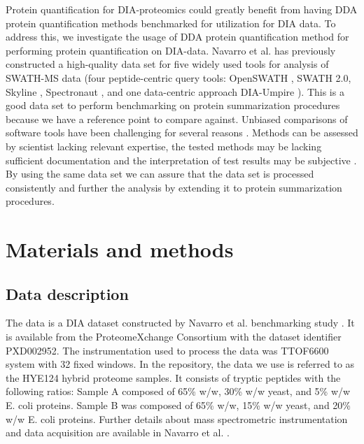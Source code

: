 \documentclass[10pt,letterpaper]{article}
\begin{document}
{Protein quantification for DIA-proteomics could greatly benefit from having DDA protein quantification methods benchmarked for utilization for DIA data. To address this, we investigate the usage of DDA protein quantification method for performing protein quantification on DIA-data. Navarro et al. \cite{navarro2016multicenter} has previously constructed a high-quality data set for five widely used tools for analysis of SWATH-MS data (four peptide-centric query tools: OpenSWATH \cite{rost2014openswath}, SWATH 2.0, Skyline \cite{maclean2010skyline}, Spectronaut \cite{bruderer2015extending}, and one data-centric approach DIA-Umpire \cite{maclean2010skyline}). This is a good data set to perform benchmarking on protein summarization procedures because we have a reference point to compare against. Unbiased comparisons of software tools have been challenging for several reasons \cite{dufresne2014abrf}. Methods can be assessed by scientist lacking relevant expertise, the tested methods may be lacking sufficient documentation and the interpretation of test results may be subjective \cite{yates2012toward} \cite{leprevost2014best} \cite{pak2013clustering} \cite{faircomparison2015}. By using the same data set we can assure that the data set is processed consistently and further the analysis by extending it to protein summarization procedures.


\section*{Materials and methods}
\subsection*{Data description}

The data is a DIA dataset constructed by Navarro et al. benchmarking study \cite{navarro2016multicenter}. It is available from the ProteomeXchange Consortium with the dataset identifier PXD002952. The instrumentation used to process the data was TTOF6600 system with 32 fixed windows. In the repository, the data we use is referred to as the HYE124 hybrid proteome samples. It consists of tryptic peptides with the following ratios: Sample A composed of 65\% w/w, 30\% w/w yeast, and 5\% w/w E. coli proteins. Sample B was composed of 65\% w/w, 15\% w/w yeast, and 20\% w/w E. coli proteins. Further details about mass spectrometric instrumentation and data acquisition are available in Navarro et al. \cite{navarro2016multicenter}.    

}
\end{document}
